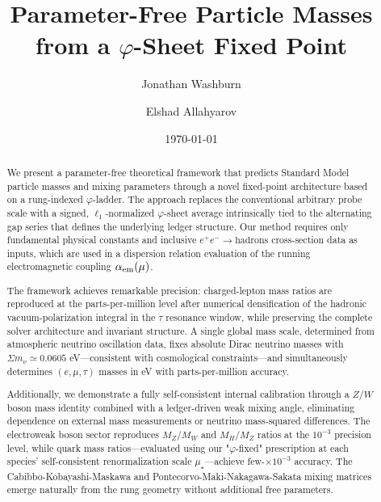 \documentclass[%
amsmath,amssymb,
aps,
prb,
floatfix, showkeys, 10pt,
]{revtex4-2}
\begin{document}
\title{Parameter-Free Particle Masses from a $\varphi$-Sheet Fixed Point}

\author{Jonathan Washburn}

\author{Elshad Allahyarov}

\date{\today}

\begin{abstract}
We present a parameter-free theoretical framework that predicts Standard Model particle masses and mixing parameters through a novel fixed-point architecture based on a rung-indexed $\varphi$-ladder. The approach replaces the conventional arbitrary probe scale with a signed, $\ell_1$-normalized $\varphi$-sheet average intrinsically tied to the alternating gap series that defines the underlying ledger structure. Our method requires only fundamental physical constants and inclusive $e^+e^-\!\to\!\text{hadrons}$ cross-section data as inputs, which are used in a dispersion relation evaluation of the running electromagnetic coupling $\alpha_{\rm em}(\mu)$.

The framework achieves remarkable precision: charged-lepton mass ratios are reproduced at the parts-per-million level after numerical densification of the hadronic vacuum-polarization integral in the $\tau$ resonance window, while preserving the complete solver architecture and invariant structure. A single global mass scale, determined from atmospheric neutrino oscillation data, fixes absolute Dirac neutrino masses with $\Sigma m_\nu\simeq 0.0605$ eV—consistent with cosmological constraints—and simultaneously determines $(e,\mu,\tau)$ masses in eV with parts-per-million accuracy.

Additionally, we demonstrate a fully self-consistent internal calibration through a $Z/W$ boson mass identity combined with a ledger-driven weak mixing angle, eliminating dependence on external mass measurements or neutrino mass-squared differences. The electroweak boson sector reproduces $M_Z/M_W$ and $M_H/M_Z$ ratios at the $10^{-3}$ precision level, while quark mass ratios—evaluated using our "$\varphi$-fixed" prescription at each species' self-consistent renormalization scale $\mu_\star$—achieve few-$\times 10^{-3}$ accuracy. The Cabibbo-Kobayashi-Maskawa and Pontecorvo-Maki-Nakagawa-Sakata mixing matrices emerge naturally from the rung geometry without additional free parameters.


\end{abstract}
\end{document}
